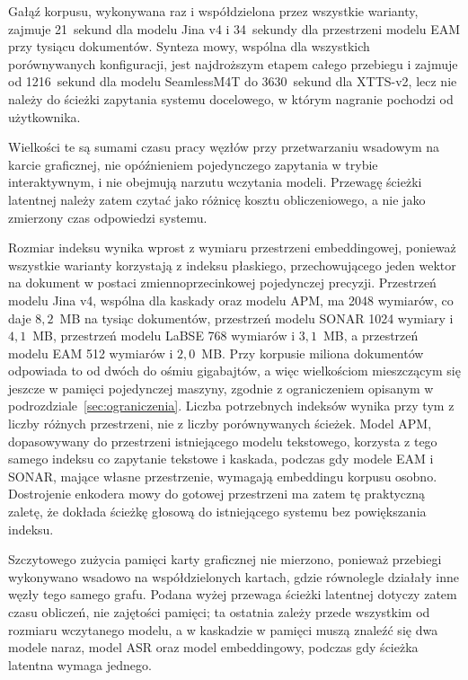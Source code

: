 Gałąź korpusu, wykonywana raz i współdzielona przez wszystkie warianty, zajmuje 21~sekund dla
modelu Jina v4 i 34~sekundy dla przestrzeni modelu EAM przy tysiącu dokumentów. Synteza mowy,
wspólna dla wszystkich porównywanych konfiguracji, jest najdroższym etapem całego przebiegu i
zajmuje od 1216~sekund dla modelu SeamlessM4T do 3630~sekund dla XTTS-v2, lecz nie należy do
ścieżki zapytania systemu docelowego, w którym nagranie pochodzi od użytkownika.

Wielkości te są sumami czasu pracy węzłów przy przetwarzaniu wsadowym na karcie graficznej, nie
opóźnieniem pojedynczego zapytania w trybie interaktywnym, i nie obejmują narzutu wczytania modeli.
Przewagę ścieżki latentnej należy zatem czytać jako różnicę kosztu obliczeniowego, a nie jako
zmierzony czas odpowiedzi systemu.

Rozmiar indeksu wynika wprost z wymiaru przestrzeni embeddingowej, ponieważ wszystkie warianty
korzystają z indeksu płaskiego, przechowującego jeden wektor na dokument w postaci
zmiennoprzecinkowej pojedynczej precyzji. Przestrzeń modelu Jina v4, wspólna dla kaskady oraz modelu
APM, ma 2048 wymiarów, co daje $8{,}2$~MB na tysiąc dokumentów, przestrzeń modelu SONAR
1024 wymiary i $4{,}1$~MB, przestrzeń modelu LaBSE 768 wymiarów i $3{,}1$~MB, a przestrzeń modelu
EAM 512 wymiarów i $2{,}0$~MB. Przy korpusie miliona dokumentów odpowiada to od dwóch do ośmiu
gigabajtów, a więc wielkościom mieszczącym się jeszcze w pamięci pojedynczej maszyny, zgodnie
z ograniczeniem opisanym w podrozdziale~\ref{sec:ograniczenia}. Liczba potrzebnych indeksów wynika przy tym z liczby
różnych przestrzeni, nie z liczby porównywanych ścieżek. Model APM, dopasowywany do przestrzeni
istniejącego modelu tekstowego, korzysta z tego samego indeksu co zapytanie tekstowe i kaskada,
podczas gdy modele EAM i SONAR, mające własne przestrzenie, wymagają embeddingu korpusu osobno.
Dostrojenie enkodera mowy do gotowej przestrzeni ma zatem tę praktyczną zaletę, że dokłada ścieżkę
głosową do istniejącego systemu bez powiększania indeksu.

Szczytowego zużycia pamięci karty graficznej nie mierzono, ponieważ przebiegi wykonywano wsadowo
na współdzielonych kartach, gdzie równolegle działały inne węzły tego samego grafu. Podana wyżej
przewaga ścieżki latentnej dotyczy zatem czasu obliczeń, nie zajętości pamięci; ta ostatnia zależy
przede wszystkim od rozmiaru wczytanego modelu, a w kaskadzie w pamięci muszą znaleźć się dwa
modele naraz, model ASR oraz model embeddingowy, podczas gdy ścieżka latentna wymaga jednego.

